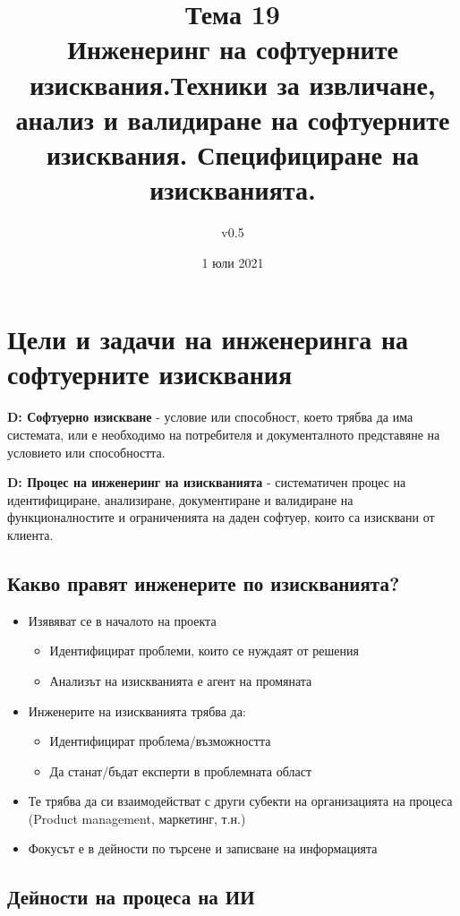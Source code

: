 \documentclass[fleqn,12pt]{article}
\title{Тема 19\\Инженеринг на софтуерните изисквания.Техники за извличане, анализ и валидиране на софтуерните изисквания. Специфициране на изискванията.}
\author{v0.5}
\date{1 юли 2021}
\begin{document}
\maketitle

\tableofcontents

\clearpage

\section{Цели и задачи на инженеринга на софтуерните изисквания}
\textbf{D: Софтуерно изискване} - условие или способност, което трябва да има системата, или е необходимо на потребителя и документалното представяне на условието или способността.

\textbf{D: Процес на инженеринг на изискванията} - систематичен процес на идентифициране, анализиране, документиране и валидиране на функционалностите и ограниченията на даден софтуер, които са изисквани от клиента.

\subsection{Какво правят инженерите по изискванията?}

\begin{itemize}
	\item Изявяват се в началото на проекта
	\begin{itemize}
		\item Идентифицират проблеми, които се нуждаят от решения
		\item Анализът на изискванията е агент на промяната
	\end{itemize}

	\item Инженерите на изискванията трябва да:
	\begin{itemize}
		\item Идентифицират проблема/възможността
		\item Да станат/бъдат експерти в проблемната област
	\end{itemize}

	\item Те трябва да си взаимодействат с други субекти на организацията на процеса (Product management, маркетинг, т.н.)

	\item Фокусът е в дейности по търсене и записване на информацията
\end{itemize}


\subsection{Дейности на процеса на ИИ}
\end{document}
